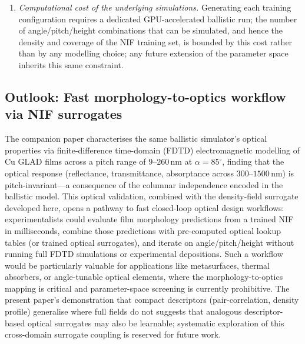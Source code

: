 \documentclass[aip,amsmath,amssymb,reprint]{revtex4-1}
\renewcommand{\ang}{\ensuremath{\alpha}} %
\begin{document}
\begin{enumerate}
    fractions for the nominally same configurations (e.g.\ at
    $\ang=85^{\circ}$: $0.126$ vs.\ $0.177$ here; at $\ang=89^{\circ}$: $0.012$
    vs.\ $0.030$ here) — a $z$-range definitional difference, not a
    data inconsistency, but one that was not disclosed here and
    should not be conflated across documents without noting which
    $z$-range each value uses.
  \item \textit{Computational cost of the underlying simulations.}
    Generating each training configuration requires a dedicated
    GPU-accelerated ballistic run; the number of angle/pitch/height
    combinations that can be simulated, and hence the density and
    coverage of the NIF training set, is bounded by this cost rather
    than by any modelling choice; any future extension of the
    parameter space inherits this same constraint.
\end{enumerate}

\subsection{Outlook: Fast morphology-to-optics workflow via NIF surrogates}
\label{ssec:disc_optical_design}

The companion paper \citep{companionP1} characterises the same ballistic simulator's optical properties via finite-difference time-domain (FDTD) electromagnetic modelling of Cu GLAD films across a pitch range of $9$--$260\,\mathrm{nm}$ at $\ang=85^{\circ}$, finding that the optical response (reflectance, transmittance, absorptance across $300$--$1500\,\mathrm{nm}$) is pitch-invariant—a consequence of the columnar independence encoded in the ballistic model.
This optical validation, combined with the density-field surrogate developed here, opens a pathway to fast closed-loop optical design workflows: experimentalists could evaluate film morphology predictions from a trained NIF in milliseconds, combine those predictions with pre-computed optical lookup tables (or trained optical surrogates), and iterate on angle/pitch/height without running full FDTD simulations or experimental depositions.
Such a workflow would be particularly valuable for applications like metasurfaces, thermal absorbers, or angle-tunable optical elements, where the morphology-to-optics mapping is critical and parameter-space screening is currently prohibitive.
The present paper's demonstration that compact descriptors (pair-correlation, density profile) generalise where full fields do not suggests that analogous descriptor-based optical surrogates may also be learnable; systematic exploration of this cross-domain surrogate coupling is reserved for future work.
\end{document}
